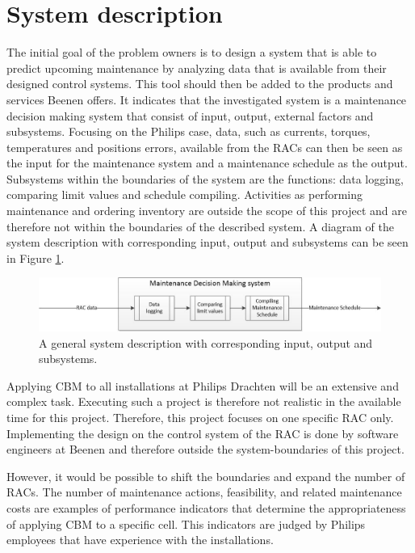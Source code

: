 \section{System description} \label{System description}
The initial goal of the problem owners is to design a system that is able to predict upcoming maintenance by analyzing data that is available from their designed control systems. This tool should then be added to the products and services Beenen offers. It indicates that the investigated system is a maintenance decision making system that consist of input, output, external factors and subsystems. Focusing on the Philips case, data, such as currents, torques, temperatures and positions errors, available from the RACs can then be seen as the input for the maintenance system and a maintenance schedule as the output. Subsystems within the boundaries of the system are the functions: data logging, comparing limit values and schedule compiling. Activities as performing maintenance and ordering inventory are outside the scope of this project and are therefore not within the boundaries of the described system. A diagram of the system description with corresponding input, output and subsystems can be seen in Figure \ref{fig:System_Description}. 
\begin{figure}[ht]
\centering
\includegraphics[width=\textwidth]{Figures/Intended_System_Description}
\caption[General system description]{A general system description with corresponding input, output and subsystems.}
\label{fig:System_Description}
\end{figure} 

Applying CBM to all installations at Philips Drachten will be an extensive and complex task. Executing such a project is therefore not realistic in the available time for this project. Therefore, this project focuses on one specific RAC only. Implementing the design on the control system of the RAC is done by software engineers at Beenen and therefore outside the system-boundaries of this project. 

However, it would be possible to shift the boundaries and expand the number of RACs. The number of maintenance actions, feasibility, and related maintenance costs are examples of performance indicators that determine the appropriateness of applying CBM to a specific cell. This indicators are judged by Philips employees that have experience with the installations.

